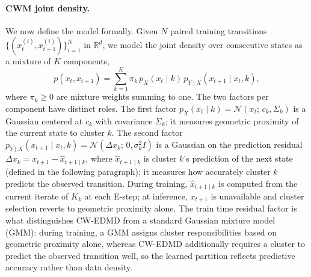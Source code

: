\documentclass{article}
\begin{document}
\paragraph{CWM joint density.} We now define the model formally. Given $N$ paired training transitions 
$\{(x_t^{(i)}, x_{t+1}^{(i)})\}_{i=1}^{N}$ in $\mathbb{R}^d$, we model the joint density 
over consecutive states as a mixture of $K$ components,
\[
p(x_t, x_{t+1}) = \sum_{k=1}^{K} \pi_k\, p_X(x_t \mid k)\, p_{Y\mid X}(x_{t+1} \mid x_t, k),
\]
where $\pi_k \geq 0$ are mixture weights summing to one. The two factors per component have 
distinct roles. The first factor $p_X(x_t \mid k) = \mathcal{N}(x_t;\, c_k, \Sigma_k)$ is a 
Gaussian centered at $c_k$ with covariance $\Sigma_k$; it measures geometric proximity of 
the current state to cluster $k$. The second factor 
$p_{Y\mid X}(x_{t+1} \mid x_t, k) = \mathcal{N}(\Delta x_k;\, 0, \sigma_k^2 I)$ is a 
Gaussian on the prediction residual $\Delta x_k = x_{t+1} - \hat{x}_{t+1\mid k}$, where 
$\hat{x}_{t+1\mid k}$ is cluster $k$'s prediction of the next state (defined in the 
following paragraph); it measures how accurately cluster $k$ predicts the observed 
transition. During training, $\hat{x}_{t+1\mid k}$ is computed from the current iterate 
of $K_k$ at each E-step; at inference, $x_{t+1}$ is unavailable 
and cluster selection reverts to geometric proximity alone. 
The train time residual factor is what distinguishes CW-EDMD from a standard Gaussian mixture model 
(GMM): during training, a GMM assigns cluster responsibilities based on geometric proximity 
alone, whereas CW-EDMD additionally requires a cluster to predict the observed transition 
well, so the learned partition reflects predictive accuracy rather than data density.
\end{document}
